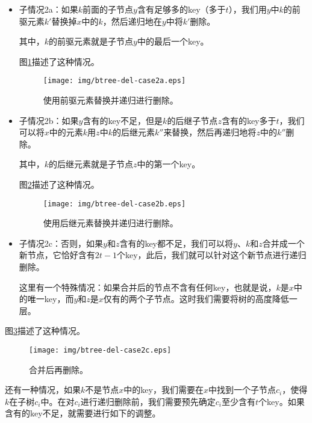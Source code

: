 \documentclass[UTF8]{article}
\begin{document}
\begin{itemize}
\item 子情况2a：如果$k$前面的子节点$y$含有足够多的key（多于$t$），我们用$y$中$k$的前驱元素$k'$替换掉$x$中的$k$，然后递归地在$y$中将$k'$删除。

其中，$k$的前驱元素就是子节点$y$中的最后一个key。

图\ref{fig:btree-del-case2a}描述了这种情况。

\begin{figure}[htbp]
  \centering
    \texttt{[image: img/btree-del-case2a.eps]}
    \caption{使用前驱元素替换并递归进行删除。} \label{fig:btree-del-case2a}
\end{figure}

\item 子情况2b：如果$y$含有的key不足，但是$k$的后继子节点$z$含有的key多于$t$，我们可以将$x$中的元素$k$用$z$中$k$的后继元素$k''$来替换，然后再递归地将$z$中的$k''$删除。

其中，$k$的后继元素就是子节点$z$中的第一个key。

图\ref{fig:btree-del-case2b}描述了这种情况。

\begin{figure}[htbp]
  \centering
    \texttt{[image: img/btree-del-case2b.eps]}
    \caption{使用后继元素替换并递归进行删除。} \label{fig:btree-del-case2b}
\end{figure}

\item 子情况2c：否则，如果$y$和$z$含有的key都不足，我们可以将$y$、$k$和$z$合并成一个新节点，它恰好含有$2t-1$个key，此后，我们就可以针对这个新节点进行递归删除。

这里有一个特殊情况：如果合并后的节点不含有任何key，也就是说，$k$是$x$中的唯一key，而$y$和$z$是$x$仅有的两个子节点。这时我们需要将树的高度降低一层。
\end{itemize}

图\ref{fig:btree-del-case2c}描述了这种情况。

\begin{figure}[htbp]
  \centering
    \texttt{[image: img/btree-del-case2c.eps]}
    \caption{合并后再删除。} \label{fig:btree-del-case2c}
\end{figure}

还有一种情况，如果$k$不是节点$x$中的key，我们需要在$x$中找到一个子节点$c_i$，使得$k$在子树$c_i$中。在对$c_i$进行递归删除前，我们需要预先确定$c_i$至少含有$t$个key。如果含有的key不足，就需要进行如下的调整。
\end{document}
